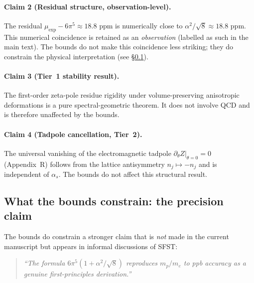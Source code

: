 \paragraph{Claim 2 (Residual structure, observation-level).}
The residual $\mu_{\exp}-6\pi^5 \approx 18.8\text{ ppm}$ is
numerically close to $\alpha^2/\sqrt{8}\approx 18.8\text{ ppm}$.
This numerical coincidence is retained as an \emph{observation}
(labelled as such in the main text).  The bounds do not
make this coincidence less striking; they do constrain the physical
interpretation (see §\ref{ssec:precisionClaim}).

\paragraph{Claim 3 (Tier~1 stability result).}
The first-order zeta-pole residue rigidity under volume-preserving
anisotropic deformations is a pure spectral-geometric theorem.  It
does not involve QCD and is therefore unaffected by the bounds.

\paragraph{Claim 4 (Tadpole cancellation, Tier~2).}
The universal vanishing of the electromagnetic tadpole
$\partial_\theta Z|_{\theta=0}=0$ (Appendix~R) follows from the
lattice antisymmetry $n_j\mapsto -n_j$ and is independent of
$\alpha_s$.  The bounds do not affect this structural result.

\subsection{What the bounds constrain: the precision claim}
\label{ssec:precisionClaim}

The bounds do constrain a stronger claim that is \emph{not} made in
the current manuscript but appears in informal discussions of SFST:

\begin{quote}
\emph{``The formula $6\pi^5(1+\alpha^2/\sqrt{8})$ reproduces
$m_p/m_e$ to ppb accuracy as a genuine first-principles derivation.''}
\end{quote}

